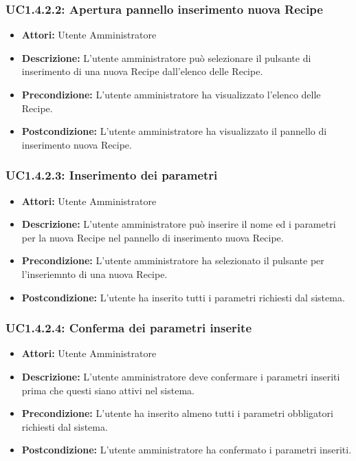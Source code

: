\subsubsection{UC1.4.2.2: Apertura pannello inserimento nuova Recipe}

\begin{itemize}
    \item \textbf{Attori:} Utente Amministratore
    \item \textbf{Descrizione:} L'utente amministratore può selezionare il pulsante di inserimento di una nuova Recipe dall'elenco delle Recipe.
    \item \textbf{Precondizione:} L'utente amministratore ha visualizzato l'elenco delle Recipe.
    \item \textbf{Postcondizione:} L'utente amministratore ha visualizzato il pannello di inserimento nuova Recipe.
\end{itemize}

\subsubsection{UC1.4.2.3: Inserimento dei parametri}

\begin{itemize}
    \item \textbf{Attori:} Utente Amministratore
    \item \textbf{Descrizione:} L'utente amministratore può inserire il nome ed i parametri per la nuova Recipe nel pannello di inserimento nuova Recipe.
    \item \textbf{Precondizione:} L'utente amministratore ha selezionato il pulsante per l'inseriemnto di una nuova Recipe.
    \item \textbf{Postcondizione:} L'utente ha inserito tutti i parametri richiesti dal sistema.
\end{itemize}

\subsubsection{UC1.4.2.4: Conferma dei parametri inserite}

\begin{itemize}
    \item \textbf{Attori:} Utente Amministratore
    \item \textbf{Descrizione:} L'utente amministratore deve confermare i parametri inseriti prima che questi siano attivi nel sistema.
    \item \textbf{Precondizione:} L'utente ha inserito almeno tutti i parametri obbligatori richiesti dal sistema.
    \item \textbf{Postcondizione:} L'utente amministratore ha confermato i parametri inseriti.
\end{itemize}

